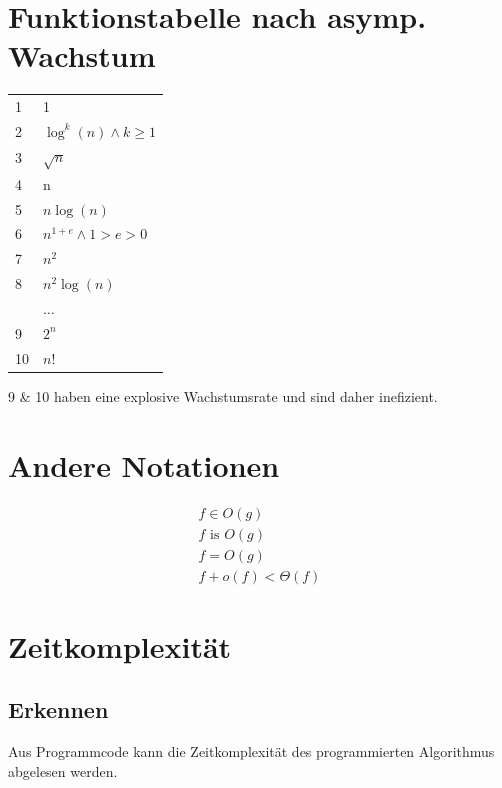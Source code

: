 \documentclass[a4paper,10pt]{report}
\begin{document}
\section{Funktionstabelle nach asymp. Wachstum}
\begin{tabularx}{\textwidth}{l|l}
	1 & 1\\
	2 & $\log^k(n) \land k \geq 1$\\
	3& $\sqrt{n}$\\
	4& n\\
	5& $n \log(n)$\\
	6& $n^{1+e} \land 1 > e > 0$\\
	7& $n^2$\\
	8& $n^2\log(n)$\\
	& $\ldots$\\ \hline 
	9 & $2^n$\\
	10& $n!$
\end{tabularx}
9 \& 10 haben eine explosive Wachstumsrate und sind daher inefizient.
 \section{Andere Notationen}
 \begin{eqnarray*}
 	f \in O(g)\\
 	f \text{ is } O(g)\\
 	f = O(g)\\
 	f + o(f) < \Theta(f) 
 \end{eqnarray*}
 \newpage
 \noindent
 \section{Zeitkomplexität}
 \subsection{Erkennen}
 Aus Programmcode kann die Zeitkomplexität des programmierten Algorithmus abgelesen werden.
\end{document}
